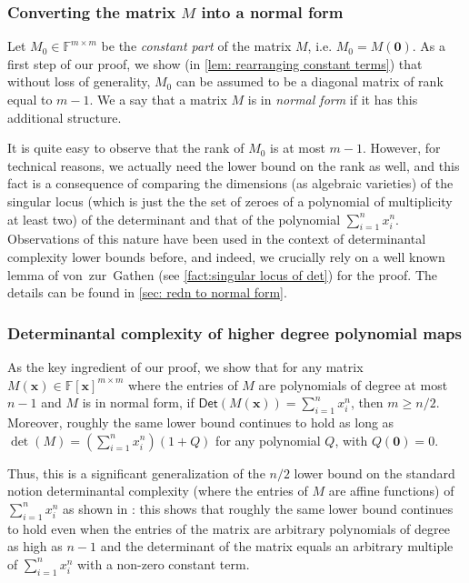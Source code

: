 \documentclass[10pt,a4paper]{article}
\newcommand{\F}{\mathbb{F}}
\newcommand{\vx}{\mathbf{x}}
\newcommand{\Det}{\mathsf{Det}}
\begin{document}
\subsubsection*{Converting the matrix $M$ into a normal form}
 Let $M_0 \in \F^{m \times m}$ be the \emph{constant part} of the matrix $M$, i.e. $M_0 = M(\mathbf{0})$.  As a first step of our proof, we show (in \autoref{lem: rearranging constant terms}) that without loss of generality, $M_0$ can be assumed to be a diagonal matrix of rank equal to  $m-1$.  We a say that a matrix $M$ is in \emph{normal form} if it has this additional structure. 
 
It is quite easy to observe that the rank of $M_0$ is at most $m-1$. However, for technical reasons, we actually need the lower bound on the rank as well, and this fact is a consequence of  comparing the dimensions (as algebraic varieties)  of the singular locus (which is just the the set of  zeroes of a polynomial of multiplicity at least two) of the determinant and that of the polynomial $\sum_{i = 1}^n x_i^n$. Observations of this nature have been used in the context of determinantal complexity lower bounds before, and indeed, we crucially rely on a well known lemma of von~zur~Gathen (see \autoref{fact:singular locus of det}) for the proof. The details can be found in \autoref{sec: redn to normal form}. 
 
\subsubsection*{Determinantal complexity of higher degree polynomial maps}
As the key ingredient of our proof, we show that for any matrix $M(\vx) \in \F[\vx]^{m\times m}$ where the entries of $M$ are polynomials  of degree at most $n-1$ and $M$ is in normal form, if $\Det(M(\vx)) =\sum_{i = 1}^n x_i^n $, then $m \geq n/2$. Moreover, roughly the same lower bound continues to hold  as long as $\det(M) = \left(\sum_{i = 1}^n x_i^n\right)(1 + Q)$ for any polynomial $Q$, with $Q(\mathbf{0}) = 0$. 

Thus, this is a significant generalization of the $n/2$ lower bound on the standard notion determinantal complexity (where the entries of $M$ are affine functions) of $\sum_{i = 1}^n x_i^n$ as shown in \cite{K19}: this shows that roughly the same lower bound continues to hold even when the entries of the matrix are arbitrary polynomials of degree as high as $n-1$ and the determinant of the matrix equals an arbitrary multiple of $\sum_{i = 1}^n x_i^n$ with a non-zero constant term. 
\end{document}
